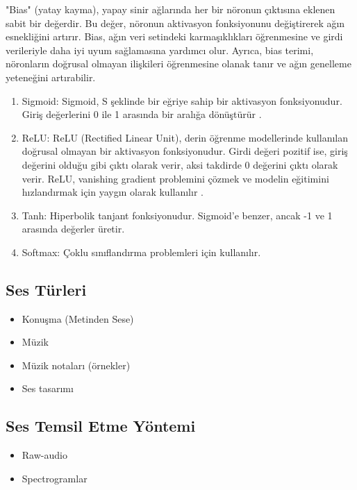 \documentclass[12pt, a4paper]{article}
\begin{document}
			"Bias" (yatay kayma), yapay sinir ağlarında her bir nöronun çıktısına eklenen sabit bir değerdir. Bu değer, nöronun aktivasyon fonksiyonunu değiştirerek ağın esnekliğini artırır. Bias, ağın veri setindeki karmaşıklıkları öğrenmesine ve girdi verileriyle daha iyi uyum sağlamasına yardımcı olur. Ayrıca, bias terimi, nöronların doğrusal olmayan ilişkileri öğrenmesine olanak tanır ve ağın genelleme yeteneğini artırabilir.
			
			
			\begin{enumerate}
				\item 	Sigmoid:
				Sigmoid, S şeklinde bir eğriye sahip bir aktivasyon fonksiyonudur. Giriş değerlerini 0 ile 1 arasında bir aralığa dönüştürür	\cite{sigmoid}.
				
				\item 	ReLU:
				ReLU (Rectified Linear Unit), derin öğrenme modellerinde kullanılan doğrusal olmayan bir aktivasyon fonksiyonudur. Girdi değeri pozitif ise, giriş değerini olduğu gibi çıktı olarak verir, aksi takdirde 0 değerini çıktı olarak verir. ReLU, vanishing gradient problemini çözmek ve modelin eğitimini hızlandırmak için yaygın olarak kullanılır \cite{relu}.
				
				\item Tanh: Hiperbolik tanjant fonksiyonudur. Sigmoid'e benzer, ancak -1 ve 1 arasında değerler üretir.
				
				\item Softmax: Çoklu sınıflandırma problemleri için kullanılır.
				
			\end{enumerate}
			
		
			\clearpage

			\subsection{Ses Türleri} 	  \vspace*{1\baselineskip}
			\begin{itemize}
				\item Konuşma (Metinden Sese)
				\item Müzik
				\item Müzik notaları (örnekler)
				\item Ses tasarımı
			\end{itemize}
			
			
			\subsection{Ses Temsil Etme Yöntemi} 	  \vspace*{1\baselineskip}
			\begin{itemize}
				\item Raw-audio
				\item Spectrogramlar
			\end{itemize}
			
\end{document}
